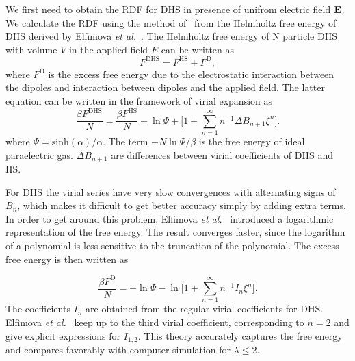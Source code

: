 \documentclass[preprint,pre,aps,superscriptaddress,a4paper]{revtex4}
\begin{document}
We first need to obtain the RDF  for DHS in presence of unifrom electric field $\bold E$. We calculate the RDF using the method  of~\cite{Madden:78:00,Lee:89:0,Kusalik:88:0,patey:85:00,faezehastrid}
from the Helmholtz free energy of DHS derived by Elfimova {\it {et al.}}~\cite{Elfimova:13:01,Elfimova:17:01}. The Helmholtz free energy of N particle DHS with volume $V$ in the applied field $E$ can be written as 
\begin{equation}
 F^\mathrm{DHS} =F^\mathrm{HS} + F^\mathrm{D},
\end{equation}
where  $ F^\mathrm{D}$ is the excess free energy due to the electrostatic interaction between the dipoles and interaction between dipoles and the applied field. The latter equation can be written in the framework of virial expansion as
\begin{equation}
\frac{\beta F^\mathrm{DHS}}{N} =\frac{\beta F^\mathrm{HS}}{N}-\ln\Psi+\bigg [1+  \sum_{n=1}^{\infty} n^{-1} \Delta B_{n+1} \xi^n\bigg ].
\end{equation}
where $\Psi=\mathrm {sinh(\alpha)/\alpha}$. The term $-N\ln \Psi/\beta $ is the free energy of ideal paraelectric gas. $\Delta B_{n+1}$ are differences between virial coefficients  of  DHS and HS.

For DHS the virial series have very slow convergences with alternating signs of $B_n$, which makes it difficult to get better accuracy simply by adding extra terms.  
In order to get around this problem, Elfimova {\it et al.}~\cite{Elfimova:12:00} introduced a logarithmic representation of the free energy.  The result converges faster, since the logarithm of a polynomial is less sensitive to the truncation of the polynomial. 
The excess free energy is then written as~\cite{Elfimova:17:00,Elfimova:13:02}

 \begin{equation}
\frac{\beta F^\mathrm{D}}{N} =-\ln\Psi-\ln \bigg [1+  \sum_{n=1}^{\infty} n^{-1} I_{n} \xi^n\bigg ].
\end{equation}
The coefficients $I_n$ are obtained from the regular virial coefficients for DHS.
Elfimova {\it et al.}~\cite{Elfimova:17:00} keep up to the third virial coefficient, corresponding to $n=2$ and give explicit expressions for $I_{1,2}$.
This theory accurately captures the free energy and compares favorably with computer simulation for $\lambda \le 2$.
\end{document}
